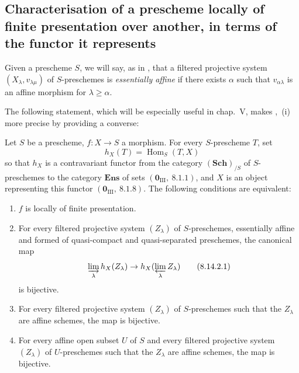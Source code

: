 \subsection{Characterisation of a prescheme locally of finite presentation over another, in terms of the functor it represents}
\label{subsection:IV.8.14}

\begin{env}[8.14.1]
\label{IV.8.14.1}
Given a prescheme $S$, we will say, as in , that a filtered projective system $(X_\lambda,v_{\lambda\mu})$ of $S$-preschemes is \emph{essentially affine} if there exists $\alpha$ such that $v_{\alpha\lambda}$ is an affine morphism for $\lambda\geqslant\alpha$.

The following statement, which will be especially useful in chap.~V, makes ,~(i) more precise by providing a converse:
\end{env}

\begin{proposition}[8.14.2]
\label{IV.8.14.2}
Let $S$ be a prescheme, $f:X\to S$ a morphism.
For every $S$-prescheme $T$, set
\[
h_X(T)=\operatorname{Hom}_S(T,X)
\]
so that $h_X$ is a contravariant functor from the category $(\mathbf{Sch})_{/S}$ of $S$-preschemes to the category $\mathbf{Ens}$ of sets $(\mathbf{0}_{\text{III}},~8.1.1)$, and $X$ is an object representing this functor $(\mathbf{0}_{\text{III}},~8.1.8)$.
The following conditions are equivalent:
\begin{enumerate}[label=\emph{\alph*)}]
  \item $f$ is locally of finite presentation.
  \item For every filtered projective system $(Z_\lambda)$ of $S$-preschemes, essentially affine  and formed of quasi-compact and quasi-separated preschemes, the canonical map 
\begin{equation}
\label{IV.8.14.2.1}
\varinjlim_\lambda h_X(Z_\lambda)\to h_X(\varprojlim_\lambda Z_\lambda) \tag{8.14.2.1}
\end{equation}
is bijective.
  \item For every filtered projective system $(Z_\lambda)$ of $S$-preschemes such that the $Z_\lambda$ are affine schemes, the map  is bijective.
  \item[\rm c$'$)] For every affine open subset $U$ of $S$ and every filtered projective system $(Z_\lambda)$ of $U$-preschemes such that the $Z_\lambda$ are affine schemes, the map  is bijective.
\end{enumerate}
\end{proposition}

